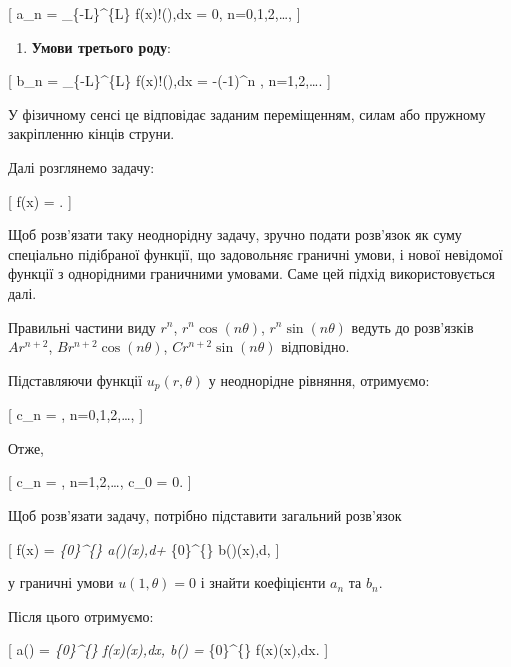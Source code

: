 \documentclass[
  ukrainian,
]{article}
\providecommand{\tightlist}{%
  \setlength{\itemsep}{0pt}\setlength{\parskip}{0pt}}
\begin{document}
{[} a\_n = \int\_\{-L\}\^{}\{L\}
f(x)\cos!\left(\right),dx = 0, \qquad n=0,1,2,\dots, {]}

\begin{enumerate}
\def\labelenumi{\arabic{enumi}.}
\setcounter{enumi}{2}
\tightlist
\item
  \textbf{Умови третього роду}:
\end{enumerate}

{[} b\_n = \int\_\{-L\}\^{}\{L\}
f(x)\sin!\left(\right),dx = -(-1)\^{}n ,
\qquad n=1,2,\dots. {]}

У фізичному сенсі це відповідає заданим переміщенням, силам або пружному
закріпленню кінців струни.

Далі розглянемо задачу:

{[} f(x) =
.
{]}

Щоб розв'язати таку неоднорідну задачу, зручно подати розв'язок як суму
спеціально підібраної функції, що задовольняє граничні умови, і нової
невідомої функції з однорідними граничними умовами. Саме цей підхід
використовується далі.

Правильні частини виду \(r^n\), \(r^n \cos(n\theta)\),
\(r^n \sin(n\theta)\) ведуть до розв'язків\\
\(Ar^{n+2}\), \(Br^{n+2} \cos(n\theta)\), \(Cr^{n+2} \sin(n\theta)\)
відповідно.

Підставляючи функції \(u_p(r,\theta)\) у неоднорідне рівняння,
отримуємо:

{[} c\_n = , \qquad n=0,1,2,\dots, {]}

Отже,

{[} c\_n = , \qquad n=1,2,\dots, \qquad c\_0 = 0. {]}

Щоб розв'язати задачу, потрібно підставити загальний розв'язок

{[} f(x) = \int\emph{\{0\}\^{}\{\infty\} a(\xi)\cos(\xi x),d\xi +
\int}\{0\}\^{}\{\infty\} b(\xi)\sin(\xi x),d\xi, {]}

у граничні умови \(u(1,\theta)=0\) і знайти коефіцієнти \(a_n\) та
\(b_n\).

Після цього отримуємо:

{[} a(\xi) = \int\emph{\{0\}\^{}\{\infty\}
f(x)\cos(\xi x),dx, \qquad b(\xi) =
\int}\{0\}\^{}\{\infty\} f(x)\sin(\xi x),dx. {]}
\end{document}
